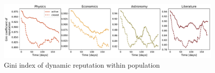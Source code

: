 \begin{figure}[h!]
	\centering
	\includegraphics[width=1\linewidth]{figures/stackexchange/gini.pdf}
	\caption{Gini index of dynamic reputation within population}
	\label{fig:dynrep-gini}
\end{figure}



